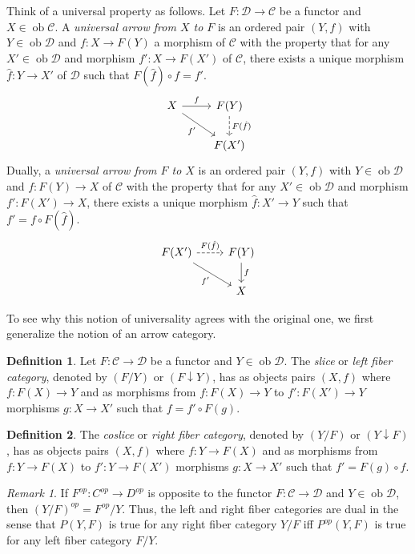 \documentclass[10pt,letterpaper,cm]{nupset}
\theoremstyle{definition}
\newtheorem{definition}{Definition}
\theoremstyle{theorem}
\theoremstyle{remark}
\newtheorem{remark}{Remark}
\newcommand{\1}{\mathbf{1}}
\renewcommand{\c}{\mathscr{C}}
\renewcommand{\d}{\mathscr{D}}
\newcommand{\0}{\vec 0}
\DeclareMathOperator{\ob}{ob}
\begin{document}
Think of a universal property as follows.  Let $F : \d \to \c$ be a functor and $X \in \ob \c$. A \textit{universal arrow from $X$ to $F$} is an ordered pair $(Y, f)$ with $Y \in \ob \d$ and $f : X \to F(Y)$ a morphism of $\c$ with the property that for any $X' \in \ob \d$ and morphism $f' : X \to F(X')$ of $\c$, there exists a unique morphism $\hat{f} : Y \to X'$ of $\d$ such that $F(\hat{f}) \circ f = f'$.
\[ \begin{tikzcd}
X \arrow[r, "f"] \arrow[swap, dr,  " f' "] & F(Y) \arrow[d, dashed, "F(\hat{f})"] \\%
 & F(X')
\end{tikzcd}
\]
Dually, a \textit{universal arrow from $F$ to $X$} is an ordered pair $(Y, f)$ with $Y \in \ob \d$ and $f: F(Y) \to X$ of $\c$ with the property that for any $X' \in \ob \d$ and morphism $f' : F(X') \to X$, there exists a unique morphism $\hat{f}: X' \to Y$ such that $f' = f \circ F(\hat{f})$.
\[ \begin{tikzcd}
F(X') \arrow[r, dashed, "F(\hat{f})"] \arrow[swap, dr,  " f' "] & F(Y) \arrow[d, "f"] \\%
 & X
\end{tikzcd}
\]



To see why this notion of universality agrees with the original one, we first generalize the notion of an arrow category.

\begin{definition}
Let $F: \c \to \d$ be a functor and $Y \in \ob \d$. The \textit{slice} or \textit{left fiber category}, denoted by $(F/Y)$ or $(F \downarrow Y)$, has as objects pairs $(X, f)$ where $f: F(X) \to Y$ and as morphisms from $f : F(X) \to Y$ to $f' : F(X') \to Y$ morphisms $g : X \to X'$ such that $f = f' \circ F(g).$ 
\end{definition}

\begin{definition}
The \textit{coslice} or \textit{right fiber category}, denoted by $(Y/F)$ or $(Y \downarrow F)$, has as objects pairs $(X, f)$ where $f: Y\to F(X)$ and as morphisms from $f :  Y \to F(X)$ to $f' : Y \to F(X')$ morphisms $g : X \to X'$ such that $f' = F(g) \circ f.$
\end{definition}

\begin{remark}
If $F^{op}:C^{op} \to D^{op}$ is opposite to the functor $F: \c \to \d$ and $Y \in \ob \d$, then $(Y/F)^{op} = {F^{op}}/{Y}$. Thus, the left and right fiber categories are dual in the sense that $P(Y, F)$ is true for any right fiber category ${Y}/{F}$ iff $P^{op}(Y, F)$ is true for any left fiber category ${F}/{Y}$. 
\end{remark}
\end{document}
